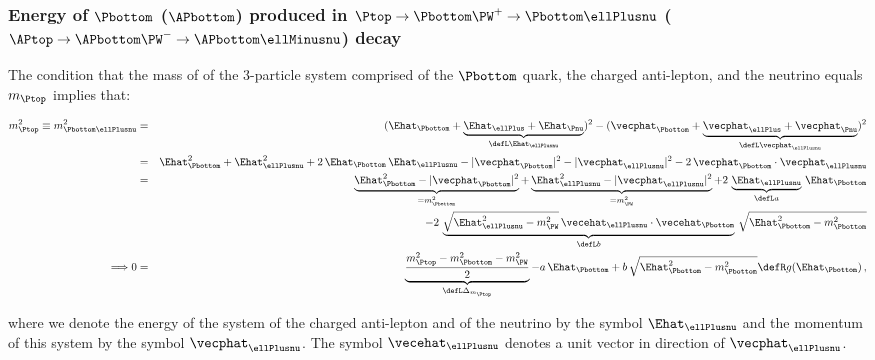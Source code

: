 \subsubsection{Energy of \texorpdfstring{$\Pbottom$}{b}  (\texorpdfstring{$\APbottom$}{bbar}) produced in \texorpdfstring{$\Ptop \to \Pbottom\PW^{+} \to \Pbottom\ellPlusnu$}{t->bW+->bl+v} (\texorpdfstring{$\APtop \to \APbottom\PW^{-} \to \APbottom\ellMinusnu$}{tbar->bbarW- ->bbarl-vbar}) decay}
\label{sec:appendix_bEn_top}

The condition that the mass of of the $3$-particle system comprised of the $\Pbottom$ quark, the charged anti-lepton, and the neutrino equals $m_{\Ptop}$ implies that:
\begin{linenowrapper}
\begin{eqnarray}
m_{\Ptop}^{2} \equiv m_{\Pbottom\ellPlusnu}^{2} 
 & = & ( \Ehat_{\Pbottom} + \underbrace{\Ehat_{\ellPlus} + \Ehat_{\Pnu}}_{\defL \Ehat_{\ellPlusnu}} )^{2} 
- ( \vecphat_{\Pbottom} + \underbrace{\vecphat_{\ellPlus} + \vecphat_{\Pnu}}_{\defL \vecphat_{\ellPlusnu}} )^{2} \nonumber \\
 & = & \Ehat_{\Pbottom}^{2} + \Ehat_{\ellPlusnu}^{2} + 2 \, \Ehat_{\Pbottom} \, \Ehat_{\ellPlusnu} 
- |\vecphat_{\Pbottom}|^{2} - |\vecphat_{\ellPlusnu}|^{2} - 2 \, \vecphat_{\Pbottom} \cdot \vecphat_{\ellPlusnu} \nonumber \\
 & = & \underbrace{\Ehat_{\Pbottom}^{2} - |\vecphat_{\Pbottom}|^{2}}_{= m_{\Pbottom}^{2}} 
+ \underbrace{\Ehat_{\ellPlusnu}^{2} - |\vecphat_{\ellPlusnu}|^{2}}_{= m_{\PW}^{2}} 
+ 2 \, \underbrace{\Ehat_{\ellPlusnu}}_{\defL a} \, \Ehat_{\Pbottom} \nonumber \\
 & & \quad - 2 \, \underbrace{\sqrt{\Ehat_{\ellPlusnu}^{2} - m_{\PW}^{2}} \, \vecehat_{\ellPlusnu} \cdot \vecehat_{\Pbottom}}_{\defL b} \, 
 \sqrt{\Ehat_{\Pbottom}^{2} - m_{\Pbottom}^{2}} \nonumber \\
\Longrightarrow 0 & = & \underbrace{\frac{m_{\Ptop}^{2} - m_{\Pbottom}^{2} - m_{\PW}^{2}}{2}}_{\defL \Delta_{m_{\Ptop}}} - a \, \Ehat_{\Pbottom} + b \, \sqrt{\Ehat_{\Pbottom}^{2} - m_{\Pbottom}^{2}} 
  \defR g(\Ehat_{\Pbottom}) \, ,
\label{eq:bEn_top1}
\end{eqnarray}
\end{linenowrapper}
where we denote the energy of the system of the charged anti-lepton and of the neutrino by the symbol $\Ehat_{\ellPlusnu}$ 
and the momentum of this system by the symbol $\vecphat_{\ellPlusnu}$.
The symbol $\vecehat_{\ellPlusnu}$ denotes a unit vector in direction of $\vecphat_{\ellPlusnu}$.
